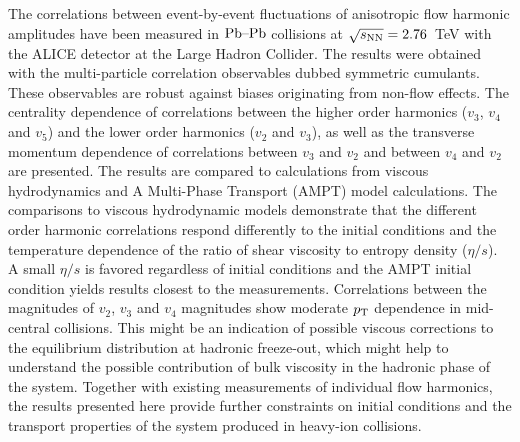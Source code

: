 The correlations between event-by-event fluctuations of anisotropic flow harmonic amplitudes
have been measured in $\textnormal{Pb--Pb}$ collisions at $\sqrt{s_{\textnormal{NN}}}=2.76$~TeV with the ALICE detector at the Large Hadron Collider. 
The results were obtained with the multi-particle correlation observables dubbed symmetric cumulants.
These observables are robust against biases originating from non-flow effects. 
The centrality dependence of correlations between the higher order harmonics ($v_3$, $v_4$ and $v_5$) and the lower order harmonics ($v_2$ and $v_3$), as well as the transverse momentum dependence of correlations between $v_3$ and $v_2$ and between $v_4$ and $v_2$ are presented. 
The results are compared to calculations from viscous hydrodynamics and  A Multi-Phase Transport ({AMPT}) model calculations.
The comparisons to viscous hydrodynamic models demonstrate that
the different order harmonic correlations respond differently to the initial conditions and the temperature dependence of the ratio of shear viscosity to entropy density ($\eta/s$). 
A small $\eta/s$ is favored regardless of initial conditions and the AMPT initial condition yields results closest to the measurements. 
Correlations between the magnitudes of $v_2$, $v_3$ and $v_4$ magnitudes show moderate $p_{\rm T}$ dependence in mid-central collisions. This might be an indication of possible viscous corrections to the equilibrium distribution at hadronic freeze-out, which might help to understand the possible contribution of bulk viscosity in the hadronic phase of the system.
Together with existing measurements of individual flow harmonics, the results presented here provide further constraints 
on initial conditions and the transport properties of the system produced in heavy-ion collisions.
